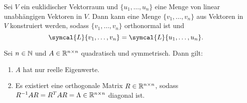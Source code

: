 \begin{repitition}\label{gram}
    Sei \(V\) ein euklidischer Vektorraum und \(\{u_1,\ldots,u_n\}\) eine Menge von linear unabhängigen Vektoren in \(V\). 
    Dann kann eine Menge \(\{v_1,\ldots,v_n\}\) aus Vektoren in \(V\)  konstruiert werden, sodass \(\{v_1,\ldots,v_n\}\) orthonormal ist und 
    \begin{equation*}
        \symcal{L}\{v_1,\ldots,v_n\} = \symcal{L}\{u_1,\ldots,u_n\}.
    \end{equation*}
\end{repitition}
\begin{theorem}[Spektralsatz]\label{spec}
    Sei \(n \in \mathbb{N}\) und \(A \in \mathbb{R}^{n \times n} \) quadratisch und symmetrisch. 
    Dann gilt:
    \begin{enumerate}[label= (\roman*)]
        \item \(A\) hat nur reelle Eigenwerte.\label{spec1}
        \item Es existiert eine orthogonale Matrix \(R \in \mathbb{R}^{n \times n}\), sodass \(R^{-1}AR = R^{T}AR = \Lambda \in \mathbb{R}^{n \times n}\) diagonal ist.\label{spec2}
    \end{enumerate}
\end{theorem}
